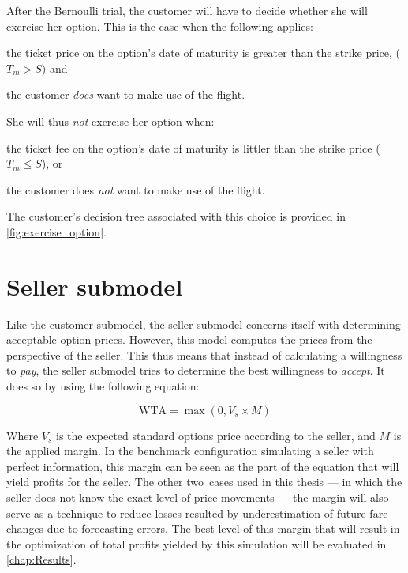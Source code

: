 After the Bernoulli trial, the customer will have to decide whether she will exercise her option. This is the case when the following applies:
\begin{compactitem}
    \item the ticket price on the option's date of maturity is greater than the strike price, ($T_m > S$) and
    \item the customer \emph{does} want to make use of the flight.
\end{compactitem}
\vspace{1em}

\noindent
She will thus \emph{not} exercise her option when:
\begin{compactitem}
    \item the ticket fee on the option's date of maturity is littler than the strike price ($T_m \le S$), or
    \item the customer does \emph{not} want to make use of the flight.
\end{compactitem}
\vspace{1em}

The customer's decision tree associated with this choice is provided in \autoref{fig:exercise_option}.





\section{Seller submodel}
\label{sec:sellerSubmodel}
Like the customer submodel, the seller submodel concerns itself with determining acceptable option prices. However, this model computes the prices from the perspective of the seller. This thus means that instead of calculating a willingness to \emph{pay}, the seller submodel tries to determine the best willingness to \emph{accept}. It does so by using the following equation:

$$ \mbox{WTA} = \max(0, V_s \times M) $$

Where $V_s$ is the expected standard options price according to the seller, and $M$ is the applied margin. In the benchmark configuration simulating a seller with perfect information, this margin can be seen as the part of the equation that will yield profits for the seller. The other two~cases used in this thesis --- in which the seller does not know the exact level of price movements --- the margin will also serve as a technique to reduce losses resulted by underestimation of future fare changes due to forecasting errors. The best level of this margin that will result in the optimization of total profits yielded by this simulation will be evaluated in \autoref{chap:Results}.


